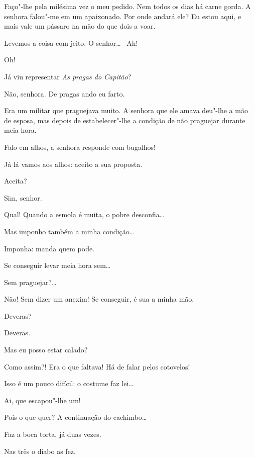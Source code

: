 Faço"-lhe pela milésima vez o meu pedido. Nem todos os dias há carne gorda. A
senhora falou"-me em um apaixonado. Por onde andará ele? Eu estou aqui, e mais
vale um pássaro na mão do que dois a voar.

   Levemos a coisa com jeito.   O
senhor\ldots\  Ah!

  Oh!

  Já viu representar \textit{As pragas do Capitão}?

  Não, senhora. De pragas ando eu farto.

  Era um militar que praguejava muito. A senhora que ele amava deu"-lhe a mão de esposa, mas depois de estabelecer"-lhe a condição de não praguejar
durante meia hora.

  Falo em alhos, a senhora responde com bugalhos!

  Já lá vamos aos alhos: aceito a sua proposta.

   Aceita?

  Sim, senhor.

   Qual! Quando a esmola é muita, o pobre
desconfia\ldots

  Mas imponho também a minha condição\ldots

  Imponha: manda quem pode.

  Se conseguir levar meia hora sem\ldots

  Sem praguejar?\ldots

  Não! Sem dizer um anexim! Se conseguir, é sua a minha mão.

  Deveras?

   Deveras.

  Mas eu posso estar calado?

  Como assim?! Era o que faltava! Há de falar pelos cotovelos!

  Isso é um pouco difícil: o costume faz lei\ldots

  Ai, que escapou"-lhe um!

  Pois o que quer? A continuação do cachimbo\ldots

  Faz a boca torta, já duas vezes.

  Nas três o diabo as fez.


